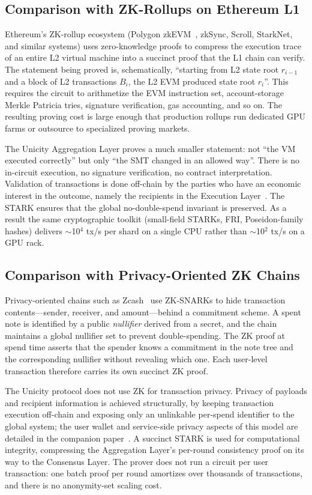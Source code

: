 \documentclass[twocolumn]{article}
\begin{document}
\subsection{Comparison with ZK-Rollups on Ethereum L1}

Ethereum's ZK-rollup ecosystem (Polygon zkEVM~\cite{polygonzkevm}, zkSync, Scroll, StarkNet, and similar systems) uses zero-knowledge proofs to compress the execution trace of an entire L2 virtual machine into a succinct proof that the L1 chain can verify. The statement being proved is, schematically, ``starting from L2 state root $r_{i-1}$ and a block of L2 transactions $B_i$, the L2 EVM produced state root $r_i$''. This requires the circuit to arithmetize the EVM instruction set, account-storage Merkle Patricia tries, signature verification, gas accounting, and so on. The resulting proving cost is large enough that production rollups run dedicated GPU farms or outsource to specialized proving markets.

The Unicity Aggregation Layer proves a much smaller statement: not ``the VM executed correctly'' but only ``the SMT changed in an allowed way''. There is no in-circuit execution, no signature verification, no contract interpretation. Validation of transactions is done off-chain by the parties who have an economic interest in the outcome, namely the recipients in the Execution Layer~\cite{exemodel}. The STARK ensures that the global no-double-spend invariant is preserved. As a result the same cryptographic toolkit (small-field STARKs, FRI, Poseidon-family hashes) delivers $\sim$10$^4$ tx/s per shard on a single CPU rather than $\sim$10$^2$ tx/s on a GPU rack.

\subsection{Comparison with Privacy-Oriented ZK Chains}

Privacy-oriented chains such as Zcash~\cite{zerocash} use ZK-SNARKs to hide transaction contents---sender, receiver, and amount---behind a commitment scheme. A spent note is identified by a public \emph{nullifier} derived from a secret, and the chain maintains a global nullifier set to prevent double-spending. The ZK proof at spend time asserts that the spender knows a commitment in the note tree and the corresponding nullifier without revealing which one. Each user-level transaction therefore carries its own succinct ZK proof.

The Unicity protocol does not use ZK for transaction privacy. Privacy of payloads and recipient information is achieved structurally, by keeping transaction execution off-chain and exposing only an unlinkable per-spend identifier to the global system; the user wallet and service-side privacy aspects of this model are detailed in the companion paper~\cite{exemodel}. A succinct STARK is used for computational integrity, compressing the Aggregation Layer's per-round consistency proof on its way to the Consensus Layer. The prover does not run a circuit per user transaction: one batch proof per round amortizes over thousands of transactions, and there is no anonymity-set scaling cost.
\end{document}
